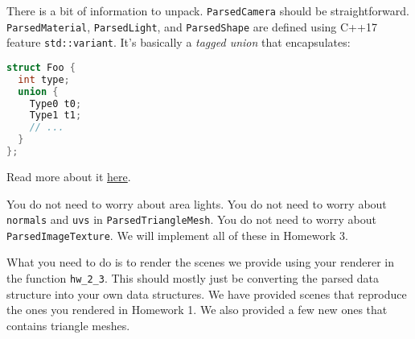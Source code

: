 There is a bit of information to unpack. \lstinline{ParsedCamera} should be straightforward.
\lstinline{ParsedMaterial}, \lstinline{ParsedLight}, and \lstinline{ParsedShape} are defined using 
C++17 feature \lstinline{std::variant}. It's basically a \emph{tagged union} that encapsulates:
\begin{lstlisting}[language=C++]
struct Foo {
  int type;
  union {
    Type0 t0;
    Type1 t1;
    // ...
  }
};
\end{lstlisting}
Read more about it \href{https://www.cppstories.com/2020/04/variant-virtual-polymorphism.html/}{here}.

You do not need to worry about area lights.
You do not need to worry about \lstinline{normals} and \lstinline{uvs} in \lstinline{ParsedTriangleMesh}.
You do not need to worry about \lstinline{ParsedImageTexture}.
We will implement all of these in Homework 3.

What you need to do is to render the scenes we provide using your renderer in the function \lstinline{hw_2_3}. This should mostly just be converting the parsed data structure into your own data structures. 
We have provided scenes that reproduce the ones you rendered in Homework 1. 
We also provided a few new ones that contains triangle meshes.

